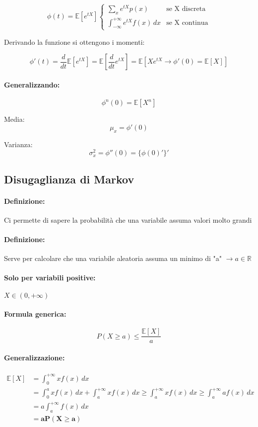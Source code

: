 \documentclass[]{article}
\newcommand{\ev}{\mathbb{E}[X]}
\renewcommand{\ev}[1]{\mathbb{E}[#1]}
\newcommand{\definizione}{\paragraph{Definizione:}}
\newcommand{\formula}{\paragraph{Formula generica:}}
\begin{document}
    \begin{equation*}
        \phi(t) = \ev{e^{tX}} 
        \begin{cases}
            \sum_{x}^{} e^{tX}p(x) & \text{se X discreta} \\
            \int_{-\infty}^{+\infty} e^{tX} f(x) \, dx & \text{se X continua}
        \end{cases}
    \end{equation*}
    \linebreak[10]
    \centerline{Derivando la funzione si ottengono i momenti:}
    \[ \phi'(t) = \frac{d}{dt} \ev{e^{tX}} = \ev{\frac{d}{dt} e^{tX}} = \ev{Xe^{tX} \longrightarrow \phi'(0) = \ev{X}}\]

    \paragraph{Generalizzando:}
    \[ \phi^{n}(0) = \ev{X^n} \]
    \linebreak[2]

    \begin{minipage}{0.45\linewidth}
        Media:
        \[\mu_x = \phi'(0)\]
    \end{minipage}
    \hfill
    \begin{minipage}{0.45\linewidth}
        Varianza:
        \[ \sigma^{2}_x = \phi''(0) = \{\phi(0)'\}' \]
    \end{minipage}
    \subsection{Disugaglianza di Markov}
    \definizione Ci permette di sapere la probabilità che una variabile assuma valori molto grandi
    \definizione Serve per calcolare che una variabile aleatoria assuma un minimo di "a" $\longrightarrow a \in \mathbb{R}$
    \paragraph{Solo per variabili positive:} $X \in (0, +\infty) $
    \formula \[ P(X \geq a) \leq \frac{\ev{X}}{a}\]

    \paragraph{Generalizzazione:}
    \begin{equation*}
        \begin{split}
            \ev{X} & = \int_{0}^{+\infty} xf(x) \, dx \\
            & = \int_{0}^{a} x f(x) \, dx + \int_{a}^{+\infty} x f(x) \, dx \geq \int_{a}^{+\infty} x f(x) \, dx \geq \int_{a}^{+\infty} a f(x) \, dx \\
            & = a \int_{a}^{+\infty} f(x) \, dx \\ 
            & = \boldsymbol{aP(X \geq a)}
        \end{split}
    \end{equation*}
    
\end{document}

